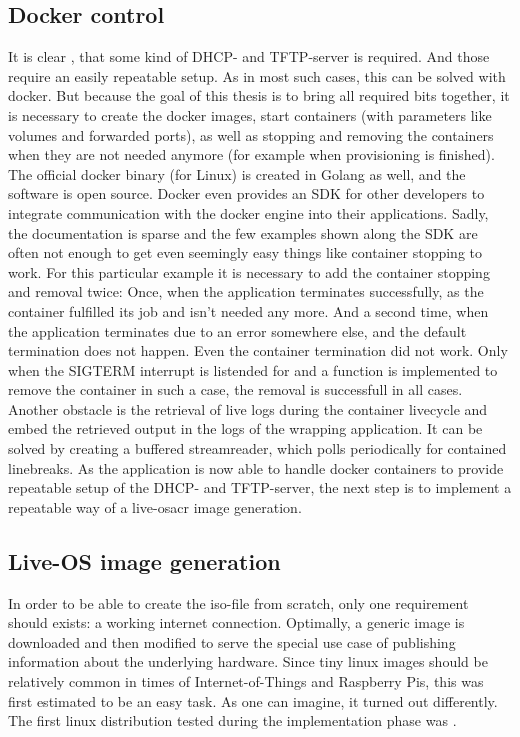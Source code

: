 \subsection{Docker control}
It is clear , that some kind of DHCP- and TFTP-server is required. And those require an easily repeatable setup. As in most such cases, this can be solved with docker. But because the goal of this thesis is to bring all required bits together, it is necessary to create the docker images, start containers (with parameters like volumes and forwarded ports), as well as stopping and removing the containers when they are not needed anymore (for example when provisioning is finished).
\newline
The official docker binary (for Linux) is created in Golang as well, and the software is open source. Docker even provides an SDK for other developers to integrate communication with the docker engine into their applications.
Sadly, the documentation is sparse and the few examples shown along the SDK are often not enough to get even seemingly easy things like container stopping to work. For this particular example it is necessary to add the container stopping and removal twice: Once, when the application terminates successfully, as the container fulfilled its job and isn't needed any more. And a second time, when the application terminates due to an error somewhere else, and the default termination does not happen. Even  the container termination did not work. Only when the SIGTERM interrupt is  listended for and a function is implemented to remove the container in such a case, the removal is successfull in all cases.
\newline
Another obstacle is the retrieval of live logs during the container livecycle and embed the retrieved output in the logs of the wrapping application. It can be solved by creating a buffered streamreader, which polls periodically for contained linebreaks.
\newline
As the application is now able to handle docker containers to provide repeatable setup of the DHCP- and TFTP-server, the next step is to implement a repeatable way of a live-\gls{osacr} image generation.

\subsection{Live-OS image generation}
In order to be able to create the iso-file from scratch, only one requirement should exists: a working internet connection. Optimally, a generic image is downloaded and then modified to serve the special use case of publishing information about the underlying hardware. Since tiny linux images should be relatively common in times of Internet-of-Things and Raspberry Pis, this was first estimated to be an easy task.
\newline
As one can imagine, it turned out differently. The first linux distribution tested during the implementation phase was .

